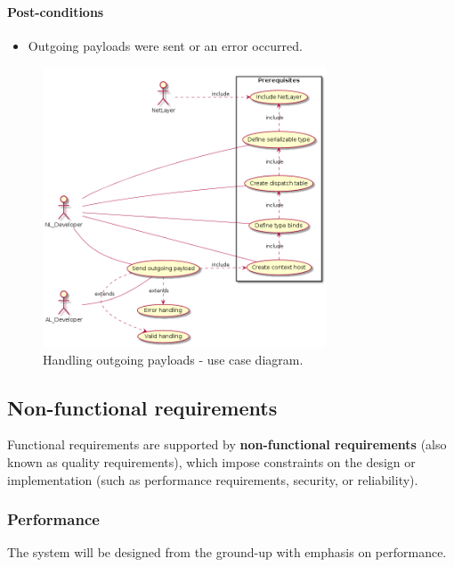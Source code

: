 \documentclass[11pt]{report}
\newcommand{\+}{\discretionary{\mbox{\scriptsize$\hookleftarrow$}}{}{}}
\renewcommand\emph{\textbf}
\begin{document}
                    \paragraph{Post-conditions}
                        \begin{itemize}
                            \item Outgoing payloads were sent or an error occurred.
                        \end{itemize}

                    \begin{figure}[H]
                    \caption{Handling outgoing payloads - use case diagram.}
                    \centering
                    \includegraphics[width=0.75\textwidth]{d/uc/outgoing.png}
                    \end{figure}



            \newpage

            \subsection{Non-functional requirements}
                Functional requirements are supported by \emph{non-functional requirements} (also known as quality requirements), which impose constraints on the design or implementation (such as performance requirements, security, or reliability).

                \subsubsection{Performance}
                    The system will be designed from the ground-up with emphasis on performance. 
\end{document}
